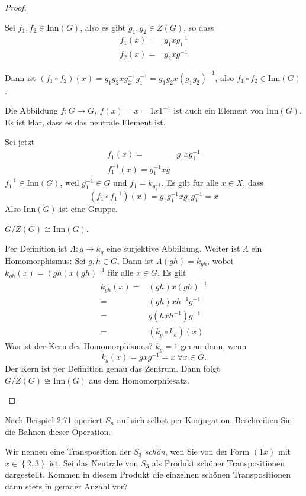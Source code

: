 \begin{proof}
\begin{parts}
		Sei $f_1,f_2\in\text{Inn}(G)$, also es gibt $g_1,g_2\in Z(G)$, so dass
		\begin{align*}
			f_1(x)=&g_1xg_1^{-1}\\
			f_2(x)=&g_2xg^{-1}
		\end{align*}
	\end{parts}
	Dann ist $(f_1\circ f_2)(x)=g_1g_2xg_2^{-1}g_1^{-1}=g_1g_2x(g_1g_2)^{-1}$, also $f_1\circ f_2\in\text{Inn}(G)$.

	Die Abbildung $f:G\to G,~f\left( x \right) =x=1x 1^{-1}$ ist auch ein Element von $\text{Inn}(G)$. Es ist klar, dass es das neutrale Element ist. 

	Sei jetzt
	\begin{align*}
		f_1(x)=&g_1xg_1^{-1}\\
		f_1^{-1}(x)=g_1^{-1}xg
	\end{align*}
	$f_1^{-1}\in \text{Inn}(G)$, weil $g_1^{-1}\in G$ und $f_1=k_{g_1^{-1}}$. Es gilt f\"{u}r alle $x\in X$, dass
	\[
		(f_1\circ f_1^{-1})(x)=g_1g_1^{-1}xg_1g_1^{-1}=x
	\]
	Also $\text{Inn}(G)$ ist eine Gruppe.
\item $G / Z(G)\cong \text{Inn}(G)$. 

	Per Definition ist $\Lambda: g\to k_g$ eine surjektive Abbildung. Weiter ist $\Lambda$ ein Homomorphismus: Sei $g,h\in G$. Dann ist $\Lambda(gh)=k_{gh}$, wobei $k_{gh}(x)=(gh)x(gh)^{-1}$ f\"{u}r alle $x\in G$. Es gilt
	\begin{align*}
		k_{gh}(x)=&(gh)x(gh)^{-1}\\
		=&(gh)xh^{-1}g^{-1}\\
		=&g(hxh^{-1})g^{-1}\\
		=&(k_g\circ k_h)(x)
	\end{align*}
	Was ist der Kern des Homomorphismus? $k_g=1$ genau dann, wenn
	\[
		k_g(x)=gxg^{-1}=x~\forall x\in G
	.\] 
	Der Kern ist per Definition genau das Zentrum. Dann folgt $G / Z(G)\cong \text{Inn}(G)$ aus dem Homomorphiesatz.
	\begin{center}
	\end{center}
\end{proof}
\begin{Problem}
	\begin{parts}
	\item Nach Beispiel 2.71 operiert $S_n$ auf sich selbst per Konjugation. Beschreiben Sie die Bahnen dieser Operation.
	\item Wir nennen eine Transposition der $S_3$ \emph{schön}, wen Sie von der Form $(1x)$ mit $x\in \left\{ 2,3 \right\} $ ist. Sei das Neutrale von $S_3$ als Produkt schöner Transpositionen dargestellt. Kommen in diesem Produkt die einzelnen schönen Transpositionen dann stets in gerader Anzahl vor? 
	\end{parts}
\end{Problem}
